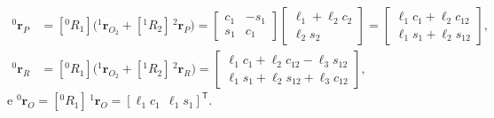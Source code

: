 \documentclass[12pt,a4paper,twoside]{article}
\newcommand{\rv}[2]{{}^{#1}\mathbf{r}_{#2}}          %
\newcommand{\Rm}[2]{[{}^{#1}R_{#2}]}                 %
\numberwithin{equation}{section}
\begin{document}
\begin{align}
  \rv{0}{P} &= \Rm{0}{1}\Big(\rv{1}{O_2} + \Rm{1}{2}\,\rv{2}{P}\Big)
   = \begin{bmatrix} c_1 & -s_1 \\ s_1 & c_1 \end{bmatrix}
     \begin{bmatrix} \ell_1 + \ell_2 c_2 \\ \ell_2 s_2 \end{bmatrix}
   = \begin{bmatrix} \ell_1 c_1 + \ell_2 c_{12}\\ \ell_1 s_1 + \ell_2 s_{12} \end{bmatrix},
  \label{eq:posP}\\
  \rv{0}{R} &= \Rm{0}{1}\Big(\rv{1}{O_2} + \Rm{1}{2}\,\rv{2}{R}\Big)
   = \begin{bmatrix} \ell_1 c_1 + \ell_2 c_{12} - \ell_3 s_{12}\\ \ell_1 s_1 + \ell_2 s_{12} + \ell_3 c_{12} \end{bmatrix},
\end{align}
e $\rv{0}{O} = \Rm{0}{1}\,\rv{1}{O} = [\ell_1 c_1\ \ \ell_1 s_1]^{\mathsf T}$.
\end{document}
